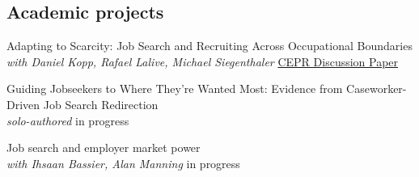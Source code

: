 \documentclass[letter, 11pt]{res}
\begin{document}
\begin{resume}
\vspace{0.5cm}
\section{Academic projects} %
\vspace{0.5cm}



Adapting to Scarcity: Job Search and Recruiting Across Occupational Boundaries  \\
{\sl with Daniel Kopp, Rafael Lalive, Michael Siegenthaler} \hfill \href{https://cepr.org/publications/dp21027}{CEPR Discussion Paper}

Guiding Jobseekers to Where They’re Wanted Most: Evidence from Caseworker-Driven Job Search Redirection  \\
{\sl solo-authored} \hfill in progress




Job search and employer market power   \\
{\sl with Ihsaan Bassier, Alan Manning} \hfill in progress



\end{resume}
\end{document}

